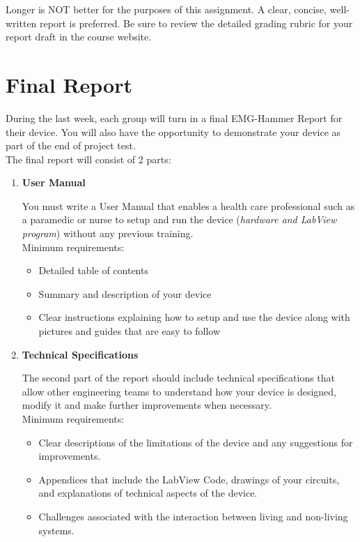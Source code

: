 \documentclass{article}
\begin{document}
Longer is NOT better for the purposes of this assignment. A clear, concise, well-written report is preferred. Be sure to review the detailed grading rubric for your report draft in the course website.

\pagebreak

\section*{Final Report}
During the last week, each group will turn in a final EMG-Hammer Report for their device. You will also have the opportunity to demonstrate your device as part of the end of project test.\\

The final report will consist of 2 parts:
\begin{enumerate}
	\item \textbf{User Manual}
	
	You must write a User Manual that enables a health care professional such as a paramedic or nurse to setup and run the device (\textit{hardware and LabView program}) without any previous training.\\
	
	Minimum requirements:
	\begin{itemize}
		\item Detailed table of contents
		\item Summary and description of your device 
		\item Clear instructions explaining how to setup and use the device along with pictures and guides that are easy to follow
	\end{itemize}
	
	\item \textbf{Technical Specifications}
	
	The second part of the report should include technical specifications that allow other engineering teams to understand how your device is designed, modify it and make further improvements when necessary.\\
	
	Minimum requirements:
	\begin{itemize}
		\item Clear descriptions of the limitations of the device and any suggestions for improvements.
		\item Appendices that include the LabView Code, drawings of your circuits, and explanations of technical aspects of the device.
		\item Challenges associated with the interaction between living and non-living systems.
	\end{itemize}
\end{enumerate}
\end{document}
